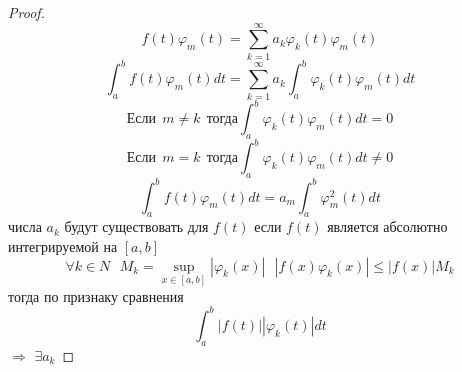 \begin{proof}
  $$
  f(t) \varphi_m(t) = \sum_{k=1}^{\infty} a_k \varphi_k(t) \varphi_m(t)
  $$
  $$
  \int_a^b f(t) \varphi_m(t) dt = \sum_{k=1}^{\infty} a_k \int_a^b
  \varphi_k(t) \varphi_m(t) dt
  $$
  $$
  \text{Если} ~~ m \not= k ~~ \text{тогда}
  \int_a^b \varphi_k(t) \varphi_m(t) dt = 0
  $$
  $$
  \text{Если} ~~ m = k ~~ \text{тогда}
  \int_a^b \varphi_k(t) \varphi_m(t) dt \not= 0
  $$
  $$
  \int_a^b f(t) \varphi_m(t) dt
  =
  a_m \int_a^b \varphi_m^2(t) dt
  $$
  числа $a_k$ будут существовать для $f(t)$ если $f(t)$ является абсолютно
  интегрируемой на $[a,b]$
  $$
  \forall k \in N
  ~~~
  M_k = \sup_{x \in [a,b]} |\varphi_k(x)|
  ~~~
  |f(x) \varphi_k(x)| \le |f(x)| M_k
  $$
  тогда по признаку сравнения
  $$
  \int_a^b |f(t)| |\varphi_k(t)| dt
  $$
  $\Rightarrow$ $\exists a_k$
\end{proof}

